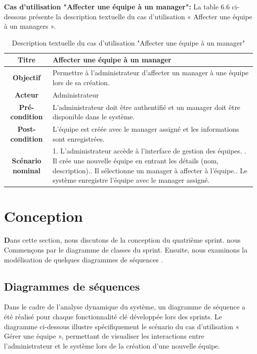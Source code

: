      \item \textbf{Cas d'utilisation "Affecter une équipe à un manager": } La table 6.6 ci-dessous présente la description textuelle du cas d'utilisation « Affecter une équipe à un managers ».
 \begin{table}[H]
 \caption{ Description textuelle du cas d’utilisation "Affecter une équipe à un manager"}
    \centering
    \begin{tabular}{|c|p{12cm}|}
    \hline
    \textbf{Titre} & Affecter une équipe à un manager\\
    \hline
    \textbf{Objectif} & Permettre à l’administrateur d’affecter un manager à une équipe lors de sa création. \\
    \hline
    \textbf{Acteur}& Administrateur\\
    \hline
    \textbf{Pré-condition} & L’administrateur doit être authentifié et un manager doit être disponible dans le système.
    \\
    \hline
    \textbf{Post-condition} & L’équipe est créée avec le manager assigné et les informations sont enregistrées.\\
    \hline
    \textbf{Scénario nominal} & 1. L’administrateur accède à l’interface de gestion des équipes. \newline
    2. Il crée une nouvelle équipe en entrant les détails (nom, description).\newline
    3. Il sélectionne un manager à affecter à l’équipe.\newline
    4. Le système enregistre l’équipe avec le manager assigné.\\
    \hline
    \end{tabular}
    \label{tab:user_stories}
\end{table}
 
\section{Conception}
\hspace{0.5cm}\textbf Dans cette section, nous discutons de la conception du quatrième sprint. nous Commençons par le diagramme de classes du sprint. Ensuite, nous examinons la modélisation de quelques diagrammes de séquences .  


\subsection{Diagrammes de séquences}
Dans le cadre de l’analyse dynamique du système, un diagramme de séquence a été réalisé pour chaque fonctionnalité clé développée lors des sprints. Le diagramme ci-dessous illustre spécifiquement le scénario du cas d'utilisation « Gérer une équipe », permettant de visualiser les interactions entre l'administrateur et le système lors de la création d’une nouvelle équipe.

